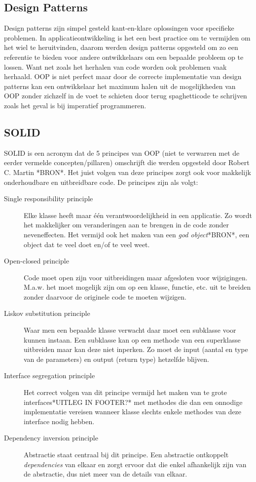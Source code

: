 \subsection{Design Patterns}
Design patterns zijn simpel gesteld kant-en-klare oplossingen voor specifieke problemen. In applicatieontwikkeling is het een best practice om te vermijden om het wiel te heruitvinden, daarom werden design patterns opgesteld om zo een referentie te bieden voor andere ontwikkelaars om een bepaalde probleem op te lossen. Want net zoals het herhalen van code worden ook problemen vaak herhaald. OOP is niet perfect maar door de correcte implementatie van design patterns kan een ontwikkelaar het maximum halen uit de mogelijkheden van OOP zonder zichzelf in de voet te schieten door terug spaghetticode te schrijven zoals het geval is bij imperatief programmeren.


\subsection{SOLID}
SOLID is een acronym dat de 5 principes van OOP (niet te verwarren met de eerder vermelde concepten/pillaren) omschrijft die werden opgesteld door Robert C. Martin *BRON*.  Het juist volgen van deze principes zorgt ook voor makkelijk onderhoudbare en uitbreidbare code. De principes zijn als volgt:
\begin{description}
  \item [Single responsibility principle] Elke klasse heeft maar één verantwoordelijkheid in een applicatie. Zo wordt het makkelijker om veranderingen aan te brengen in de code zonder neveneffecten. Het vermijd ook het maken van een \textit{god object}*BRON*, een object dat te veel doet en/of te veel weet.
  \item [Open-closed principle] Code moet open zijn voor uitbreidingen maar afgesloten voor wijzigingen. M.a.w. het moet mogelijk zijn om op een klasse, functie, etc. uit te breiden zonder daarvoor de originele code te moeten wijzigen. 
  \item [Liskov substitution principle] Waar men een bepaalde klasse verwacht daar moet een subklasse voor kunnen instaan. Een subklasse kan op een methode van een superklasse uitbreiden maar kan deze niet inperken. Zo moet de input (aantal en type van de parameters) en output (return type) hetzelfde blijven.
  \item [Interface segregation principle] Het correct volgen van dit principe vermijd het maken van te grote interfaces*UITLEG IN FOOTER?* met methodes die dan een onnodige implementatie vereisen wanneer klasse slechts enkele methodes van deze interface nodig hebben.
  \item [Dependency inversion principle] Abstractie staat centraal bij dit principe. Een abstractie ontkoppelt \textit{dependencies} van elkaar en zorgt ervoor dat die enkel afhankelijk zijn van de abstractie, dus niet meer van de details van elkaar.
\end{description}

